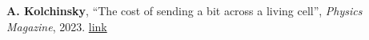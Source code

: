 
\textbf{A. Kolchinsky}, ``The cost of sending a bit across a living cell'', \emph{Physics Magazine}, 2023. 
\href{https://physics.aps.org/articles/v16/133}{link}
